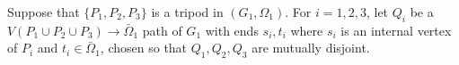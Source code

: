 Suppose that $\{P_1, P_2, P_3\}$ is a tripod in $(G_1, \Omega_1)$. For $i = 1, 2, 3$, let $Q_i$ be a $V(P_1 \cup P_2 \cup P_3) \to \bar{\Omega}_1$ path of $G_1$ with ends $s_i, t_i$ where $s_i$ is an internal vertex of $P_i$ and $t_i \in \bar{\Omega}_1$, chosen so that $Q_1, Q_2, Q_3$ are mutually disjoint.
